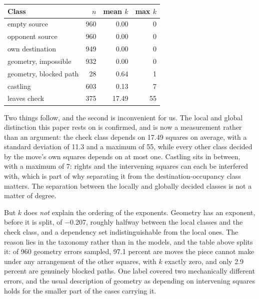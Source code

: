 \documentclass[11pt]{article}
\begin{document}
\begin{center}
\small
\begin{tabular}{lrrr}
\toprule
\textbf{Class} & \textbf{$n$} & \textbf{mean $k$} & \textbf{max $k$} \\
\midrule
empty source           & 960 & 0.00 & 0 \\
opponent source        & 960 & 0.00 & 0 \\
own destination        & 949 & 0.00 & 0 \\
\midrule
geometry, impossible   & 932 & 0.00 & 0 \\
geometry, blocked path & 28 & 0.64 & 1 \\
castling               & 603 & 0.13 & 7 \\
\midrule
leaves check           & 375 & 17.49 & 55 \\
\bottomrule
\end{tabular}
\end{center}

Two things follow, and the second is inconvenient for us. The local and global
distinction this paper rests on is confirmed, and is now a measurement rather than
an argument: the check class depends on 17.49 squares on average, with a
standard deviation of 11.3 and a maximum of 55, while every other
class decided by the move's own squares depends on at most one. Castling sits in
between, with a maximum of 7: rights and the intervening squares can
each be interfered with, which is part of why separating it from the
destination-occupancy class matters. The separation between the locally and globally
decided classes is not a matter of degree.

But $k$ does \emph{not} explain the ordering of the exponents. Geometry has an
exponent, before it is split, of $-$0.207, roughly halfway between the local
classes and the check class, and a dependency set indistinguishable from the local
ones. The reason lies in
the taxonomy rather than in the models, and the table above splits it: of
960 geometry errors sampled, 97.1 percent are moves the piece cannot
make under any arrangement of the other squares, with $k$ exactly zero, and only
2.9 percent are genuinely blocked paths. One label covered two mechanically
different errors, and the usual description of geometry as depending on intervening
squares holds for the smaller part of the cases carrying it.
\end{document}
